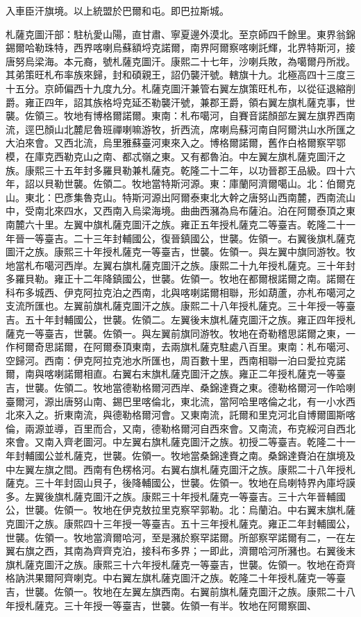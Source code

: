 \begin{pinyinscope}
入車臣汗旗境。以上統盟於巴爾和屯。即巴拉斯城。

札薩克圖汗部：駐杭愛山陽，直甘肅、寧夏邊外漠北。至京師四千餘里。東界翁錦錫爾哈勒珠特，西界喀喇烏蘇額埒克諾爾，南界阿爾察喀喇託輝，北界特斯河，接唐努烏梁海。本元裔，號札薩克圖汗。康熙二十七年，沙喇兵敗，為噶爾丹所戕。其弟策旺札布率族來歸，封和碩親王，詔仍襲汗號。轄旗十九。北極高四十三度三十五分。京師偏西十九度九分。札薩克圖汗兼管右翼左旗策旺札布，以從征退縮削爵。雍正四年，詔其族格埒克延丕勒襲汗號，兼郡王爵，領右翼左旗札薩克事，世襲。佐領三。牧地有博格爾諾爾。東南：札布噶河，自賽音諾顏部左翼左旗界西南流，逕巴顏山北麓尼魯班禪喇嘛游牧，折西流，席喇烏蘇河南自阿爾洪山水所匯之大泊來會。又西北流，烏里雅蘇臺河東來入之。博格爾諾爾，舊作白格爾察罕鄂模，在庫克西勒克山之南、都忒嶺之東。又有都魯泊。中左翼左旗札薩克圖汗之族。康熙三十五年封多羅貝勒兼札薩克。乾隆二十二年，以功晉郡王品級。四十六年，詔以貝勒世襲。佐領二。牧地當特斯河源。東：庫蘭阿濟爾噶山。北：伯爾克山。東北：巴彥集魯克山。特斯河源出阿爾泰東北大幹之唐努山西南麓，西南流山中，受南北來四水，又西南入烏梁海境。曲曲西瀦為烏布薩泊。泊在阿爾泰頂之東南麓六十里。左翼中旗札薩克圖汗之族。雍正五年授札薩克二等臺吉。乾隆二十一年晉一等臺吉。二十三年封輔國公，復晉鎮國公，世襲。佐領一。右翼後旗札薩克圖汗之族。康熙三十年授札薩克一等臺吉，世襲。佐領一。與左翼中旗同游牧。牧地當札布噶河西岸。左翼右旗札薩克圖汗之族。康熙二十九年授札薩克。三十年封多羅貝勒。雍正十二年降鎮國公，世襲。佐領一。牧地在都爾根諾爾之南。諾爾在科布多城西、伊克阿拉克泊之西南，北與喀喇諾爾相聯，形如葫蘆，亦札布噶河之支流所匯也。左翼前旗札薩克圖汗之族。康熙二十八年授札薩克。三十年授一等臺吉。五十年封輔國公，世襲。佐領二。左翼後末旗札薩克圖汗之族。雍正四年授札薩克一等臺吉，世襲。佐領一。與左翼前旗同游牧。牧地在奇勒稽思諾爾之東，一作柯爾奇思諾爾，在阿爾泰頂東南，去兩旗札薩克駐處八百里。東南：札布噶河、空歸河。西南：伊克阿拉克池水所匯也，周百數十里，西南相聯一泊曰愛拉克諾爾，南與喀喇諾爾相直。右翼右末旗札薩克圖汗之族。雍正二年授札薩克一等臺吉，世襲。佐領二。牧地當德勒格爾河西岸、桑錦達賚之東。德勒格爾河一作哈喇臺爾河，源出唐努山南、錫巴里喀倫北，東北流，當阿哈里喀倫之北，有一小水西北來入之。折東南流，與德勒格爾河會。又東南流，託爾和里克河北自博爾圖斯喀倫，兩源並導，百里而合，又南，德勒格爾河自西來會。又南流，布克綏河自西北來會。又南入齊老圖河。中左翼右旗札薩克圖汗之族。初授二等臺吉。乾隆二十一年封輔國公並札薩克，世襲。佐領一。牧地當桑錦達賚之南。桑錦達賚泊在旗境及中左翼左旗之間。西南有色楞格河。右翼右旗札薩克圖汗之族。康熙二十八年授札薩克。三十年封固山貝子，後降輔國公，世襲。佐領一。牧地在烏喇特界內庫埒謨多。左翼後旗札薩克圖汗之族。康熙三十年授札薩克一等臺吉。三十六年晉輔國公，世襲。佐領一。牧地在伊克敖拉里克察罕郭勒。北：烏蘭泊。中右翼末旗札薩克圖汗之族。康熙四十三年授一等臺吉。五十三年授札薩克。雍正二年封輔國公，世襲。佐領一。牧地當濟爾哈河，至是瀦於察罕諾爾。所部察罕諾爾有二，一在左翼右旗之西，其南為齊齊克泊，接科布多界；一即此，濟爾哈河所瀦也。右翼後末旗札薩克圖汗之族。康熙三十六年授札薩克一等臺吉，世襲。佐領一。牧地在奇齊格訥洪果爾阿齊喇克。中右翼左旗札薩克圖汗之族。乾隆二十年授札薩克一等臺吉，世襲。佐領一。牧地在左翼左旗西南。右翼前旗札薩克圖汗之族。康熙二十八年授札薩克。三十年授一等臺吉，世襲。佐領一有半。牧地在阿爾察圖、
\end{pinyinscope}
